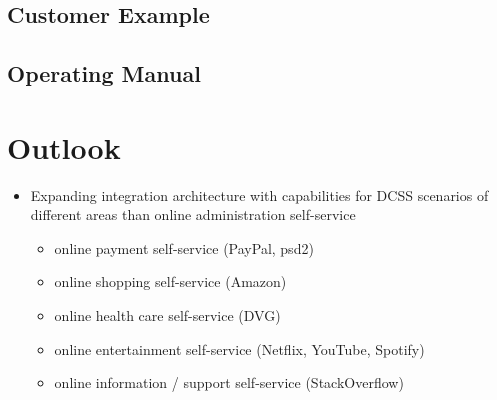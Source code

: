 \documentclass[
     12pt,         %
     a4paper,      %
     BCOR=10mm,version=first,     %
     DIV=14,version=first,        %
     ]{scrreprt}
\begin{document}
\section{Customer Example}

\section{Operating Manual}

\chapter{Outlook}

\begin{itemize}
     \item Expanding integration architecture with capabilities for DCSS scenarios of different areas than online administration self-service
     \begin{itemize}
          \item online payment self-service (PayPal, psd2)
          \item online shopping self-service (Amazon)
          \item online health care self-service (DVG)
          \item online entertainment self-service (Netflix, YouTube, Spotify)
          \item online information / support self-service (StackOverflow)
     \end{itemize}
\end{itemize}

\printbibliography
\end{document}
